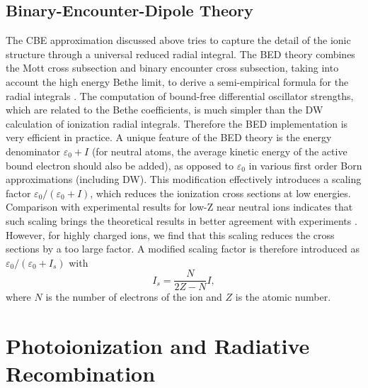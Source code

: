 \subsection{Binary-Encounter-Dipole Theory}
The CBE approximation discussed above tries to capture the detail of the ionic
structure through a universal reduced radial integral. The BED theory combines
the Mott cross subsection and binary encounter cross subsection, taking into
account the high energy Bethe limit, to derive a semi-empirical formula for the
radial integrals \cite{kim94}. The computation of bound-free differential
oscillator strengths, which are related to the Bethe coefficients, is much
simpler than the DW calculation of ionization radial integrals. Therefore the
BED implementation is very efficient in practice. A unique feature of the BED
theory is the energy denominator $\varepsilon_0+I$ (for neutral atoms, the
average kinetic energy of the active bound electron should also be added), as
opposed to $\varepsilon_0$ in various first order Born approximations
(including DW). This modification effectively introduces a scaling factor
$\varepsilon_0/(\varepsilon_0+I)$, which reduces the ionization cross sections
at low energies. Comparison with experimental results for low-Z near neutral
ions indicates that such scaling brings the theoretical results in better
agreement with experiments \cite{kim94}. However, for highly charged ions, we
find that this scaling reduces the cross sections by a too large factor. A
modified scaling factor is therefore introduced as
$\varepsilon_0/(\varepsilon_0+I_s)$ with
\begin{equation}
I_s = \frac{N}{2Z-N}I,
\end{equation}
where $N$ is the number of electrons of the ion and $Z$ is the atomic
number.


\section{Photoionization and Radiative Recombination}
\label{sec:pirr}
